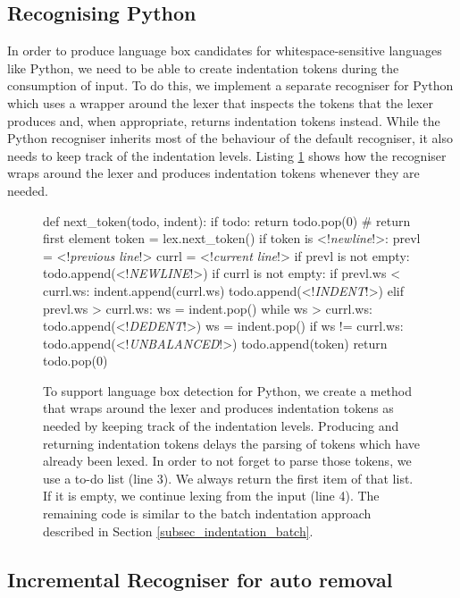 \documentclass[sigplan,screen]{acmart}\settopmatter{printfolios=true,printccs=false,printacmref=false}
\begin{document}
\subsection{Recognising Python}
\label{sec:impl_wsrec}

In order to produce language box candidates for whitespace-sensitive languages
like Python, we need to be able to create indentation tokens during the
consumption of input. To do
this, we implement a separate recogniser for Python which uses a wrapper around the lexer that inspects
the tokens that the lexer produces and, when appropriate, returns indentation
tokens instead. While the Python recogniser inherits most of the behaviour of
the default recogniser, it also needs to keep track of the indentation levels. Listing
\ref{lst_next_token_indent} shows how the recogniser wraps around the lexer and
produces indentation tokens whenever they are needed.

\begin{figure}
\begin{lstdefault}[basicstyle=\linespread{1.0}\footnotesize\ttfamily]
def next_token(todo, indent):
  if todo:
    return todo.pop(0) # return first element
  token = lex.next_token()
  if token is <!\textit{newline}!>:
    prevl = <!\textit{previous line}!>
    currl = <!\textit{current line}!>
    if prevl is not empty:
      todo.append(<!\textit{NEWLINE}!>)
    if currl is not empty:
      if prevl.ws < currl.ws:
        indent.append(currl.ws)
        todo.append(<!\textit{INDENT}!>)
      elif prevl.ws > currl.ws:
        ws = indent.pop()
        while ws > currl.ws:
          todo.append(<!\textit{DEDENT}!>)
          ws = indent.pop()
        if ws != currl.ws:
          todo.append(<!\textit{UNBALANCED}!>)
  todo.append(token)
  return todo.pop(0)
\end{lstdefault}
\caption{To support language box detection for Python, we
create a method that wraps around the lexer and produces indentation tokens as
needed by keeping track of the indentation levels. Producing and returning
indentation tokens delays the parsing of tokens which have already been lexed.
In order to not forget to parse those tokens, we use a to-do list (line 3). We
always return the first item of that list. If it is empty, we continue lexing
from the input (line 4). The remaining code is similar to the batch indentation
approach described in Section \ref{subsec_indentation_batch}.
}
\label{lst_next_token_indent}
\end{figure}

\subsection{Incremental Recogniser for auto removal}
\label{sec:impl_removerec}
\end{document}
